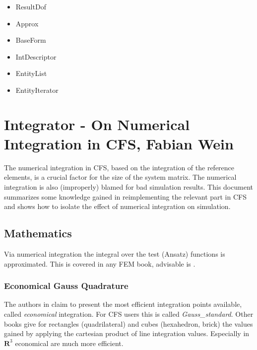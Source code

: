 \begin{itemize}
\item ResultDof

\item Approx
\item BaseForm
\item IntDescriptor
\item EntityList
\item EntityIterator
\end{itemize}

\section{Integrator - On Numerical Integration in CFS, Fabian Wein}

The numerical  integration in CFS, based  on the integration of  the reference
elements, is a crucial factor for the size of the system matrix. The numerical
integration  is also  (improperly)  blamed for  bad  simulation results.  This
document summarizes some knowledge gained  in reimplementing the relevant part
in  CFS and  shows  how to  isolate  the effect  of  numerical integration  on
simulation.

\subsection{Mathematics}
Via numerical integration the integral over the test (Ansatz) functions is 
approximated. This is covered in any FEM book, advisable is \cite{Solin04}.  

\subsubsection{Economical Gauss Quadrature}

The authors in \cite{Solin04} claim  to present the most efficient integration
points available,  called \textit{economical} integration. For  CFS users this
is   called  \textit{Gauss\_standard}.   Other  books   give  for   rectangles
(quadrilateral) and  cubes (hexahedron, brick)  the values gained  by applying
the cartesian product of line integration values. Especially in $\mathbf{R}^3$
economical are much more efficient.

